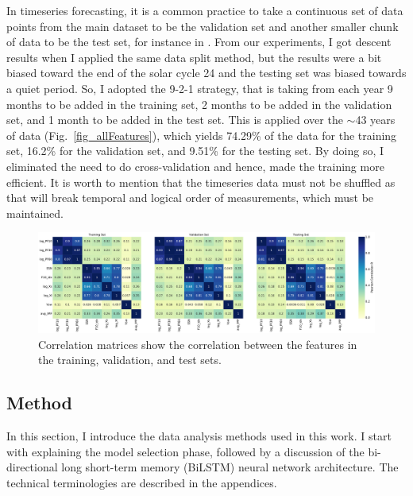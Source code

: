 In timeseries forecasting, it is a common practice to take a continuous set of data points from the main dataset to be the validation set and another smaller chunk of data to be the test set, for instance in \citet{pala_2019, benson_2020, zhang_2022, zhu_2022}. 
From our experiments, I got descent results when I applied the same data split method, but the results were a bit biased toward the end of the solar cycle 24 and the testing set was biased towards a quiet period. So, I adopted the 9-2-1 strategy, that is taking from each year 9 months to be added in the training set, 2 months to be added in the validation set, and 1 month to be added in the test set. This is applied over the $\sim$43 years of data (Fig.~\ref{fig_allFeatures}), which yields 74.29\% of the data for the training set, 16.2\% for the validation set, and 9.51\% for the testing set. By doing so, I eliminated the need to do cross-validation and hence, made the training more efficient.
It is worth to mention that the timeseries data must not be shuffled as that will break temporal and logical order of measurements, which must be maintained.

\begin{figure}[htp]
	\centering
    \includegraphics[width=\textwidth]{chapter4/figs/dataset_split_corr.pdf}
    \caption{Correlation matrices show the correlation between the features in the training, validation, and test sets.}
\label{fig_dataCorr}
\end{figure}

\subsection{Method}
In this section, I introduce the data analysis methods used in this work. I start with explaining the model selection phase, followed by a discussion of the bi-directional long short-term memory (BiLSTM) neural network architecture. The technical terminologies are described in the appendices.

